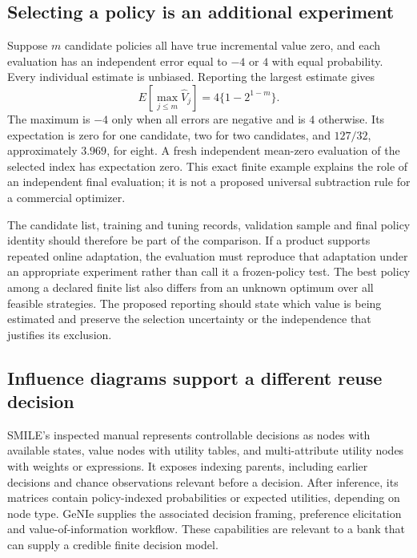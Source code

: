 \subsection{Selecting a policy is an additional experiment}

Suppose $m$ candidate policies all have true incremental value zero, and each
evaluation has an independent error equal to $-4$ or $4$ with equal probability.
Every individual estimate is unbiased. Reporting the largest estimate gives
\[
 E\left[\max_{j\leq m}\widehat V_j\right]
 =4\{1-2^{1-m}\}.
\]
The maximum is $-4$ only when all errors are negative and is $4$ otherwise.
Its expectation is zero for one candidate, two for two candidates, and
$127/32$, approximately $3.969$, for eight. A fresh independent mean-zero
evaluation of the selected index has expectation zero. This exact finite
example explains the role of an independent final evaluation; it is not a
proposed universal subtraction rule for a commercial optimizer.
\citep{exec16_cp_exact}

The candidate list, training and tuning records, validation sample and final
policy identity should therefore be part of the comparison. If a product
supports repeated online adaptation, the evaluation must reproduce that
adaptation under an appropriate experiment rather than call it a frozen-policy
test. The best policy among a declared finite list also differs from an
unknown optimum over all feasible strategies. The proposed reporting should
state which value is being estimated and preserve the selection uncertainty
or the independence that justifies its exclusion. \citep{jiang2016,exec16_cp_matrix}

\subsection{Influence diagrams support a different reuse decision}

SMILE's inspected manual represents controllable decisions as nodes with
available states, value nodes with utility tables, and multi-attribute utility
nodes with weights or expressions. It exposes indexing parents, including
earlier decisions and chance observations relevant before a decision. After
inference, its matrices contain policy-indexed probabilities or expected
utilities, depending on node type. GeNIe supplies the associated decision
framing, preference elicitation and value-of-information workflow. These
capabilities are relevant to a bank that can supply a credible finite decision
model. \citep{exec16_cp_bayesfusion}

